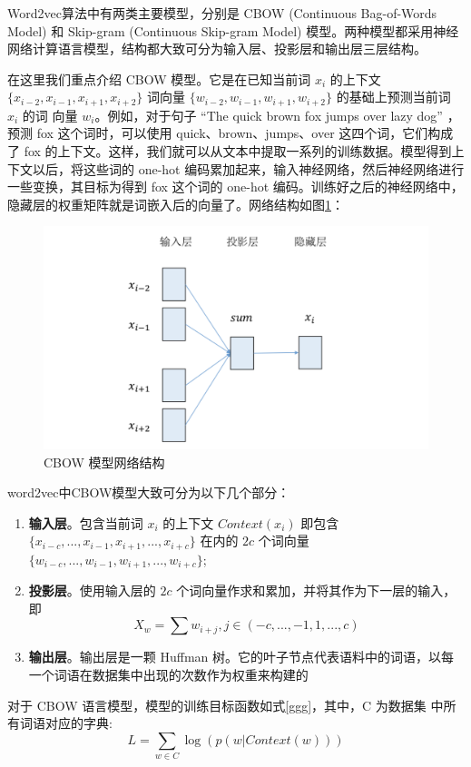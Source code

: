 Word2vec算法中有两类主要模型，分别是 CBOW (Continuous Bag-of-Words Model) 和 Skip-gram (Continuous Skip-gram Model) 模型。两种模型都采用神经网络计算语言模型，结构都大致可分为输入层、投影层和输出层三层结构。

在这里我们重点介绍 CBOW 模型。它是在已知当前词 $x_i$ 的上下文 $\{x_{i−2}, x_{i−1}, x_{i+1}, x_{i+2}\}$ 词向量 $\{w_{i−2}, w_{i−1}, w_{i+1}, w_{i+2}\}$ 的基础上预测当前词 $x_i$ 的词 向量 $w_i$。例如，对于句子 “The quick brown fox jumps over lazy dog” ，预测 fox 这个词时，可以使用 quick、brown、jumps、over 这四个词，它们构成了 fox 的上下文。这样，我们就可以从文本中提取一系列的训练数据。模型得到上下文以后，将这些词的 one-hot 编码累加起来，输入神经网络，然后神经网络进行一些变换，其目标为得到 fox 这个词的 one-hot 编码。训练好之后的神经网络中，隐藏层的权重矩阵就是词嵌入后的向量了。网络结构如图\ref{fig:CBOW}：
\begin{figure}[ht]
    \centering
    \includegraphics[width=\linewidth]{figures/CBOW.png}
    \caption{CBOW 模型网络结构}
    \label{fig:CBOW}
\end{figure}

word2vec中CBOW模型大致可分为以下几个部分：
\begin{enumerate}
	\item \textbf{输入层}。包含当前词 $x_i$ 的上下文 $Context(x_i)$ 即包含 $\{x_{i−c},..., x_{i−1}, x_{i+1},..., x_{i+c}\}$ 在内的 $2c$ 个词向量 $\{w_{i−c},..., w_{i−1}, w_{i+1},...,w_{i+c}\}$;
	\item \textbf{投影层}。使用输入层的 $2c$ 个词向量作求和累加，并将其作为下一层的输入，即
		\begin{equation}
			X_{w} = \sum w_{i+j}, j \in (-c,...,-1,1,...,c)
		\end{equation}
	\item \textbf{输出层}。输出层是一颗 Huffman 树。它的叶子节点代表语料中的词语，以每一个词语在数据集中出现的次数作为权重来构建的
\end{enumerate}
对于 CBOW 语言模型，模型的训练目标函数如式\ref{ggg}，其中，C 为数据集
中所有词语对应的字典:
	\begin{equation}
		L=\sum_{w \in C} \log (p(w | Context(w)))
	\label{ggg}
	\end{equation}
	
